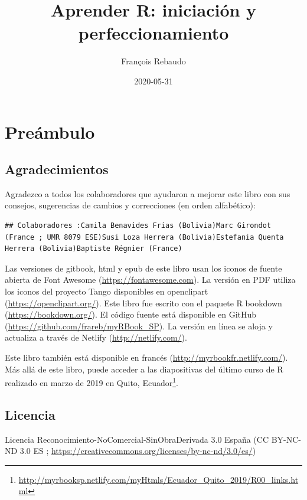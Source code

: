 \documentclass[
]{book}
\title{Aprender R: iniciación y perfeccionamiento}
\author{François Rebaudo}
\date{2020-05-31}
\renewcommand{\href}[2]{#2\footnote{\url{#1}}}
\begin{document}
\maketitle

{
\setcounter{tocdepth}{1}
\tableofcontents
}
\hypertarget{preuxe1mbulo}{%
\chapter{Preámbulo}\label{preuxe1mbulo}}

\hypertarget{remerciements}{%
\section{Agradecimientos}\label{remerciements}}

Agradezco a todos los colaboradores que ayudaron a mejorar este libro con sus consejos, sugerencias de cambios y correcciones (en orden alfabético):

\begin{verbatim}
## Colaboradores :Camila Benavides Frias (Bolivia)Marc Girondot (France ; UMR 8079 ESE)Susi Loza Herrera (Bolivia)Estefania Quenta Herrera (Bolivia)Baptiste Régnier (France)
\end{verbatim}

Las versiones de gitbook, html y epub de este libro usan los iconos de fuente abierta de Font Awesome (\url{https://fontawesome.com}). La versión en PDF utiliza los iconos del proyecto Tango disponibles en openclipart (\url{https://openclipart.org/}). Este libro fue escrito con el paquete R bookdown (\url{https://bookdown.org/}). El código fuente está disponible en GitHub (\url{https://github.com/frareb/myRBook_SP}). La versión en línea se aloja y actualiza a través de Netlify (\url{http://netlify.com/}).

Este libro también está disponible en francés (\url{http://myrbookfr.netlify.com/}). Más allá de este libro, puede acceder a las diapositivas del \href{http://myrbooksp.netlify.com/myHtmls/Ecuador_Quito_2019/R00_links.html}{último curso de R realizado en marzo de 2019 en Quito, Ecuador}.

\hypertarget{licence}{%
\section{Licencia}\label{licence}}

Licencia Reconocimiento-NoComercial-SinObraDerivada 3.0 España (CC BY-NC-ND 3.0 ES ; \url{https://creativecommons.org/licenses/by-nc-nd/3.0/es/})
\end{document}
